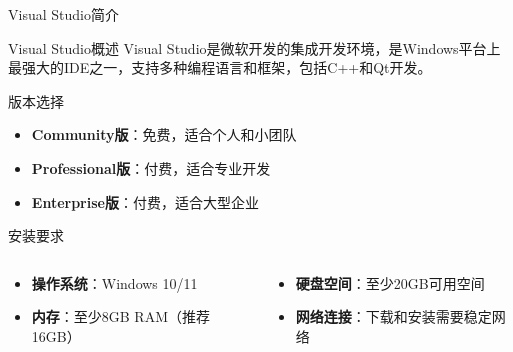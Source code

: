 \documentclass[UTF8,aspectratio=169]{beamer}
\begin{document}
\begin{frame}{Visual Studio简介}
    \begin{ytublock}{Visual Studio概述}
        Visual Studio是微软开发的集成开发环境，是Windows平台上最强大的IDE之一，支持多种编程语言和框架，包括C++和Qt开发。
    \end{ytublock}

    \begin{ytublock}{版本选择}
        \begin{itemize}
            \item \textbf{Community版}：免费，适合个人和小团队
            \item \textbf{Professional版}：付费，适合专业开发
            \item \textbf{Enterprise版}：付费，适合大型企业
        \end{itemize}
    \end{ytublock}

    \begin{ytublock}{安装要求}
        \begin{columns}
            \begin{column}{0.48\textwidth}
                \begin{itemize}
                    \item \textbf{操作系统}：Windows 10/11
                    \item \textbf{内存}：至少8GB RAM（推荐16GB）
                \end{itemize}
            \end{column}
            \hspace{0.02\textwidth}
            \begin{column}{0.48\textwidth}
                \begin{itemize}
                    \item \textbf{硬盘空间}：至少20GB可用空间
                    \item \textbf{网络连接}：下载和安装需要稳定网络
                \end{itemize}
            \end{column}
        \end{columns}
    \end{ytublock}
\end{frame}
\end{document}
